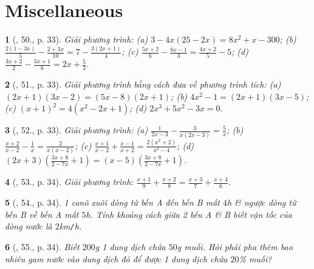 \documentclass{article}
\newtheorem{baitoan}{}
\begin{document}

\section{Miscellaneous}

\begin{baitoan}[\cite{SGK_Toan_8_tap_2}, 50., p. 33]
	Giải phương trình: (a) $3 - 4x(25 - 2x) = 8x^2 + x - 300$; (b) $\frac{2(1 - 3x)}{5} - \frac{2 + 3x}{10} = 7 - \frac{3(2x + 1)}{4}$; (c) $\frac{5x + 2}{6} - \frac{8x - 1}{3} = \frac{4x + 2}{5} - 5$; (d) $\frac{3x + 2}{2} - \frac{3x + 1}{6} = 2x + \frac{5}{3}$.
\end{baitoan}

\begin{baitoan}[\cite{SGK_Toan_8_tap_2}, 51., p. 33]
	Giải phương trình bằng cách đưa về phương trình tích: (a) $(2x + 1)(3x - 2) = (5x - 8)(2x + 1)$; (b) $4x^2 - 1 = (2x + 1)(3x - 5)$; (c) $(x + 1)^2 = 4(x^2 - 2x + 1)$; (d) $2x^3 + 5x^2 - 3x = 0$.
\end{baitoan}

\begin{baitoan}[\cite{SGK_Toan_8_tap_2}, 52., p. 33]
	Giải phương trình: (a) $\frac{1}{2x - 3} - \frac{3}{x(2x - 3)} = \frac{5}{x}$; (b) $\frac{x + 2}{x - 2} - \frac{1}{x} = \frac{2}{x(x - 2)}$; (c) $\frac{x + 1}{x - 2} + \frac{x - 1}{x + 2} = \frac{2(x^2 + 2)}{x^2 - 4}$; (d) $(2x + 3)\left(\frac{3x + 8}{2 - 7x} + 1\right) = (x - 5)\left(\frac{3x + 8}{2 - 7x} + 1\right)$.
\end{baitoan}

\begin{baitoan}[\cite{SGK_Toan_8_tap_2}, 53., p. 34]
	Giải phương trình: $\frac{x + 1}{9} + \frac{x + 2}{8} = \frac{x + 3}{7} + \frac{x + 4}{6}$.
\end{baitoan}

\begin{baitoan}[\cite{SGK_Toan_8_tap_2}, 54., p. 34]
	1 canô xuôi dòng từ bến A đến bến B mất $4$\emph{h} \& ngược dòng từ bến B về bến A mất $5$\emph{h}. Tính khoảng cách giữa 2 bến A \& B biết vận tốc của dòng nước là $2$\emph{km\texttt{/}h}. 
\end{baitoan}

\begin{baitoan}[\cite{SGK_Toan_8_tap_2}, 55., p. 34]
	Biết $200$\emph{g} 1 dung dịch chứa $50$\emph{g} muối. Hỏi phải pha thêm bao nhiêu gam nước vào dung dịch đó để được 1 dung dịch chứa $20$\% muối?
\end{baitoan}
\end{document}
